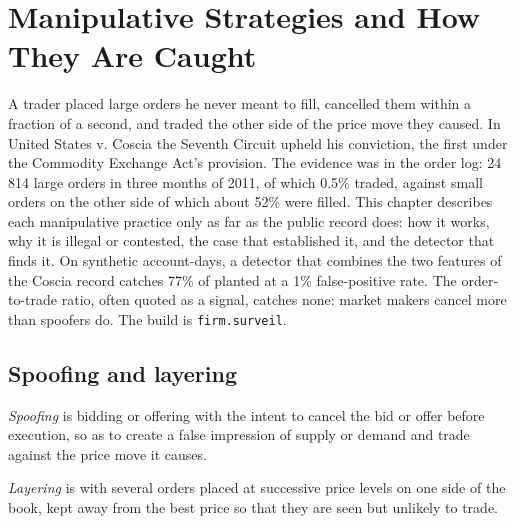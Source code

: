 \chapter{Manipulative Strategies and How They Are Caught}\label{ch:s2:manipulative-strategies-and-how-they-are-caught}

A trader placed large orders he never meant to fill, cancelled them within a fraction of a second, and traded the other side of the price move they
caused. In United States v. Coscia the Seventh Circuit upheld his conviction, the first under the Commodity Exchange Act's  provision.
The evidence was in the order log: 24\,814 large orders in three months of 2011, of which 0.5\% traded, against small orders on the other side of which
about 52\% were filled. This chapter describes each manipulative practice only as far as the public record does: how it works, why it is illegal or
contested, the case that established it, and the detector that finds it. On synthetic account-days, a detector that combines the two features of the
Coscia record catches 77\% of planted  at a 1\% false-positive rate. The order-to-trade ratio, often quoted as a  signal, catches none:
market makers cancel more than spoofers do. The build is \texttt{firm.surveil}.

\section{Spoofing and layering}

\begin{definition}[Spoofing]\label{def:s2:manipulative-strategies-and-how-they-are-caught:spoofing}
\emph{Spoofing} is bidding or offering with the intent to cancel the bid or offer before execution, so as to create a false
impression of supply or demand and trade against the price move it causes.
\end{definition}

\begin{definition}[Layering]\label{def:s2:manipulative-strategies-and-how-they-are-caught:layering}
\emph{Layering} is  with several orders placed at successive price levels on one side of the book, kept away from the best
price so that they are seen but unlikely to trade.
\end{definition}

